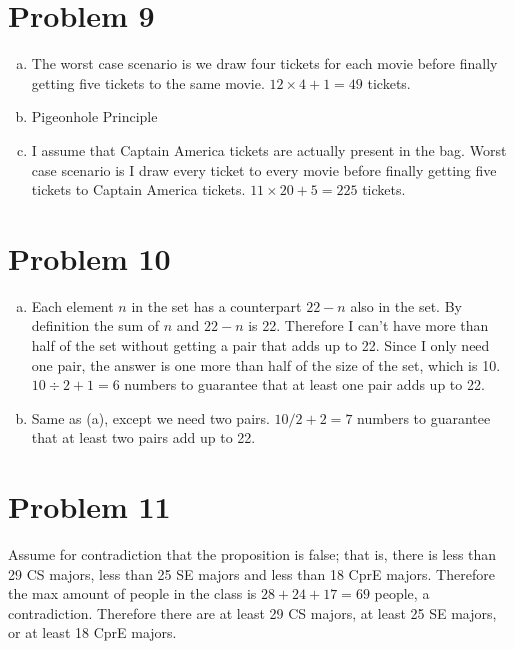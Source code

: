 \documentclass[11pt]{article}
\begin{document}
\section*{Problem 9}
\begin{enumerate}[(a)]
	\item
	The worst case scenario is we draw four tickets for each movie before finally getting five tickets to the same movie. $12 \times 4 + 1 = 49$ 
	tickets.
	
	\item
	Pigeonhole Principle
	
	\item
	I assume that Captain America tickets are actually present in the bag. Worst case scenario is I draw every ticket to every movie before finally 
	getting five tickets to Captain America tickets. $11 \times 20 + 5 = 225$ tickets.
\end{enumerate}

\section*{Problem 10}
\begin{enumerate}[(a)]
	\item
	Each element $n$ in the set has a counterpart $22-n$ also in the set. By definition the sum of $n$ and $22-n$ is 22. Therefore I can't have 
	more than half of the set without getting a pair that adds up to 22. Since I only need one pair, the answer is one more than half of the size 
	of the set, which is 10. $10 \div 2 + 1 = 6$ numbers to guarantee that at least one pair adds up to 22.
	
	\item
	Same as (a), except we need two pairs. $10/2 +2 = 7$ numbers to guarantee that at least two pairs add up to 22.	
\end{enumerate}

\section*{Problem 11}
	Assume for contradiction that the proposition is false; that is, there is less than 29 CS majors, less than 25 SE majors and less than 18 CprE 
	majors. Therefore the max amount of people in the class is $28 + 24+ 17=69$ people, a contradiction. Therefore there are at least 29 CS majors, 
	at least 25 SE majors, or at least 18 CprE majors.
\end{document}
